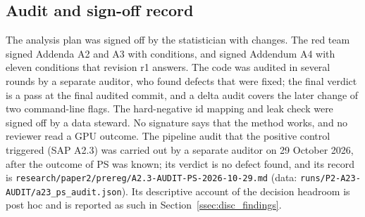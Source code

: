 \subsection{Audit and sign-off record}\label{app:audits}
The analysis plan was signed off by the statistician with changes.
The red team signed Addenda A2 and A3 with conditions, and signed Addendum A4 with eleven conditions that revision r1 answers.
The code was audited in several rounds by a separate auditor, who found defects that were fixed; the final verdict is a pass at the
final audited commit, and a delta audit covers the later change of two command-line flags.
The hard-negative id mapping and leak check were signed off by a data steward.
No signature says that the method works, and no reviewer read a GPU outcome.
The pipeline audit that the positive control triggered (SAP A2.3) was carried out by a separate auditor on 29 October 2026, after the
outcome of PS was known; its verdict is no defect found, and its record is
\nolinkurl{research/paper2/prereg/A2.3-AUDIT-PS-2026-10-29.md} (data: \nolinkurl{runs/P2-A23-AUDIT/a23_ps_audit.json}).
Its descriptive account of the decision headroom is post hoc and is reported as such in Section~\ref{ssec:disc_findings}.

